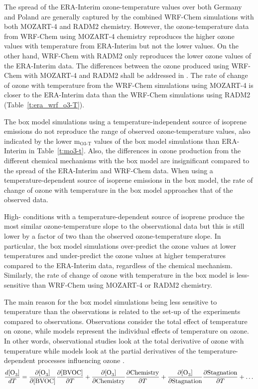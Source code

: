 The spread of the ERA-Interim ozone-temperature values over both Germany and Poland are generally captured by the combined WRF-Chem simulations with both MOZART-4 and RADM2 chemistry. 
However, the ozone-temperature data from WRF-Chem using MOZART-4 chemistry reproduces the higher ozone values with temperature from ERA-Interim but not the lower values.
On the other hand, WRF-Chem with RADM2 only reproduces the lower ozone values of the ERA-Interim data.
The differences between the ozone produced using WRF-Chem with MOZART-4 and RADM2 shall be addressed in \citet{Mar:2015}.
The rate of change of ozone with temperature from the WRF-Chem simulations using MOZART-4 is closer to the ERA-Interim data than the WRF-Chem simulations using RADM2 (Table~\ref{t:era_wrf_o3-T}).

The box model simulations using a temperature-independent source of isoprene emissions do not reproduce the range of observed ozone-temperature values, also indicated by the lower m$_{\text{O3-T}}$ values of the box model simulations than ERA-Interim in Table~\ref{t:mo3-t}.
Also, the differences in ozone production from the different chemical mechanisms with the box model are insignificant compared to the spread of the ERA-Interim and WRF-Chem data.
When using a temperature-dependent source of isoprene emissions in the box model, the rate of change of ozone with temperature in the box model approaches that of the observed data.

High- conditions with a temperature-dependent source of isoprene produce the most similar ozone-temperature slope to the observational data but this is still lower by a factor of two than the observed ozone-temperature slope.
In particular, the box model simulations over-predict the ozone values at lower temperatures and under-predict the ozone values at higher temperatures compared to the ERA-Interim data, regardless of the chemical mechanism.
Similarly, the rate of change of ozone with temperature in the box model is less-sensitive than WRF-Chem using MOZART-4 or RADM2 chemistry.

The main reason for the box model simulations being less sensitive to temperature than the observations is related to the set-up of the experiments compared to observations.
Observations consider the total effect of temperature on ozone, while models represent the individual effects of temperature on ozone. 
In other words, observational studies look at the total derivative of ozone with temperature while models look at the partial derivatives of the temperature-dependent processes influencing ozone \citep{Rasmussen:2013}. 
\begin{equation*} 
    \frac{d[\ce{O3}]}{dT} = \frac{\partial [\ce{O3}]}{\partial [\text{BVOC}]}\frac{\partial [\text{BVOC}]}{\partial T} + \frac{\partial [\ce{O3}]}{\partial \text{Chemistry}}\frac{\partial \text{Chemistry}}{\partial T} + \frac{\partial [\ce{O3}]}{\partial \text{Stagnation}}\frac{\partial \text{Stagnation}}{\partial T} + \dots
\end{equation*}

